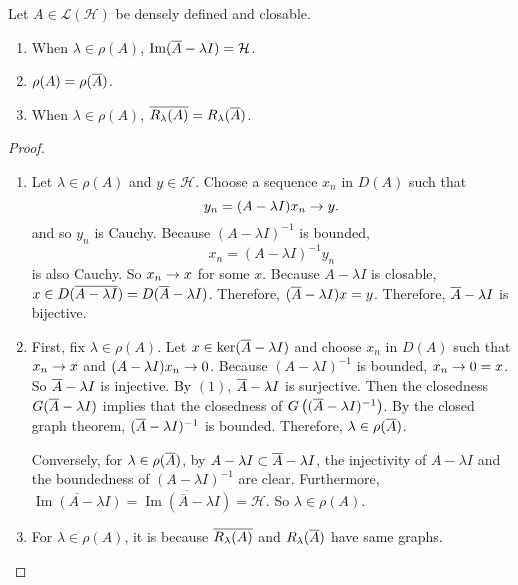 \documentclass[a4paper,12pt]{article}
\begin{document}
\begin{prop}
    Let $A \in \mathcal{L}(\mathcal{H})$ be densely defined and closable.
    \begin{enumerate}[label=(\arabic{*})]
        \item When $\lambda \in \rho(A)$, $\operatorname{Im}(\overline{A} - \lambda I) = \mathcal{H}$.
        \item $\rho(A) = \rho(\overline{A})$.
        \item When $\lambda \in \rho(A)$, $\overline{R_\lambda(A)} = R_{\lambda}(\overline{A})$.
    \end{enumerate}
\end{prop}
\begin{proof}
    \begin{enumerate}[label=(\arabic{*})]
        \item Let $\lambda \in \rho(A)$ and $y \in \mathcal{H}$. Choose a sequence $x_n$ in $D(A)$ such that 
        \begin{equation*}
            y_n = (A-\lambda I) x_n \rightarrow y.
        \end{equation*}
        and so $y_n$ is Cauchy. Because $(A-\lambda I)^{-1}$ is bounded, 
        \begin{equation*}
            x_n = (A-\lambda I)^{-1} y_n
        \end{equation*}
        is also Cauchy. So $x_n \rightarrow x$ for some $x$. Because $A - \lambda I$ is closable, $x \in D(\overline{A - \lambda I}) = D(\overline{A} - \lambda I)$. Therefore, $(\overline{A} - \lambda I)x = y$. Therefore, $\overline{A} - \lambda I$ is bijective.

        \item First, fix $\lambda \in \rho(A)$. Let $x \in \ker (\overline{A} - \lambda I)$ and choose $x_n$ in $D(A)$ such that $x_n \rightarrow x$ and $(A - \lambda I)x_n \rightarrow 0$. Because $(A-\lambda I)^{-1}$ is bounded, $x_n \rightarrow 0 = x$. So $\overline{A} - \lambda I$ is injective. By $(1)$, $\overline{A} - \lambda I$ is surjective. Then the closedness $G(\overline{A} - \lambda I)$ implies that the closedness of $G\left((\overline{A} - \lambda I)^{-1}\right)$. By the closed graph theorem, $(\overline{A} - \lambda I)^{-1}$ is bounded. Therefore, $\lambda \in \rho(\overline{A})$.

        Conversely, for $\lambda \in \rho(\overline{A})$, by $A -\lambda I \subset \overline{A} - \lambda I$, the injectivity of $A -\lambda I$ and the boundedness of $(A - \lambda I)^{-1}$ are clear. Furthermore, $\overline{\operatorname{Im}(A-\lambda I)}=\overline{\operatorname{Im}(\bar{A}-\lambda I)}= \mathcal{H}$. So $\lambda \in \rho(A)$.

        \item For $\lambda \in \rho(A)$, it is because $\overline{R_\lambda(A)}$ and $R_{\lambda}(\overline{A})$ have same graphs. \qedhere
    \end{enumerate}
\end{proof}
\end{document}
